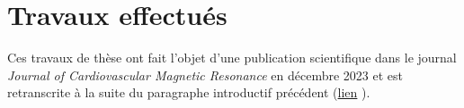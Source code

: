 \section{Travaux effectués}

Ces travaux de thèse ont fait l’objet d’une publication scientifique dans le journal \textit{Journal of Cardiovascular Magnetic Resonance} en décembre 2023 et est retranscrite à la suite du paragraphe introductif précédent (\href{https://doi.org/10.1186/s12968-023-00989-y}{lien} ).

